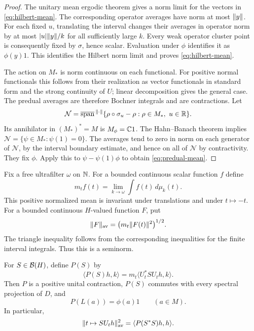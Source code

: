 \begin{proof}
The unitary mean ergodic theorem gives a norm limit for the vectors in
\eqref{eq:hilbert-mean}. The corresponding operator averages have norm
at most $\lVert y\rVert$. For each fixed $u$, translating the interval changes
their averages in operator norm by at most
$\lvert u\rvert\lVert y\rVert/k$ for all sufficiently large $k$.
Every weak operator cluster point is consequently fixed by $\sigma$,
hence scalar. Evaluation under $\phi$ identifies it as $\phi(y)1$.
This identifies the Hilbert norm limit and proves
\eqref{eq:hilbert-mean}.

The action on $M_*$ is norm continuous on each functional.
For positive normal functionals this follows from their realization as
vector functionals in standard form and the strong continuity of $U$;
linear decomposition gives the general case.
The predual averages are therefore Bochner integrals and are
contractions. Let
\[
  \mathcal N=\overline{\operatorname{span}}^{\,\lVert\cdot\rVert}
   \{\rho\circ\sigma_u-\rho:\rho\in M_*,\ u\in\mathbb R\}.
\]
Its annihilator in $(M_*)^*=M$ is $M_\phi=\mathbb C1$.
The Hahn--Banach theorem implies
$\mathcal N=\{\psi\in M_*:\psi(1)=0\}$.
The averages tend to zero in norm on each generator of $\mathcal N$,
by the interval boundary estimate, and hence on all of $\mathcal N$ by
contractivity. They fix $\phi$. Apply this to $\psi-\psi(1)\phi$ to
obtain \eqref{eq:predual-mean}.
\end{proof}

Fix a free ultrafilter $\omega$ on $\mathbb N$. For a bounded continuous scalar
function $f$ define
\[
  m_t f(t)=\lim_{k\to\omega}\int f(t)\,d\mu_k(t).
\]
This positive normalized mean is invariant under translations and under
$t\mapsto-t$. For a bounded continuous $H$-valued function $F$, put
\[
  \lVert F\rVert_{\mathrm{av}}
  =\bigl(m_t\lVert F(t)\rVert^2\bigr)^{1/2}.
\]
The triangle inequality follows from the corresponding inequalities for
the finite interval integrals. Thus this is a seminorm.

\begin{lemma}\label{mod:average}
For $S\in\mathcal B(H)$, define $P(S)$ by
\[
  \langle P(S)h,k\rangle
  =m_t\langle U_t^*SU_th,k\rangle.
\]
Then $P$ is a positive unital contraction, $P(S)$ commutes with every
spectral projection of $D$, and
\begin{equation}\label{eq:scalar-average}
  P(L(a))=\phi(a)1\qquad(a\in M).
\end{equation}
In particular,
\begin{equation}\label{eq:quadratic-average}
  \lVert t\mapsto SU_th\rVert_{\mathrm{av}}^2
  =\langle P(S^*S)h,h\rangle.
\end{equation}
\end{lemma}

